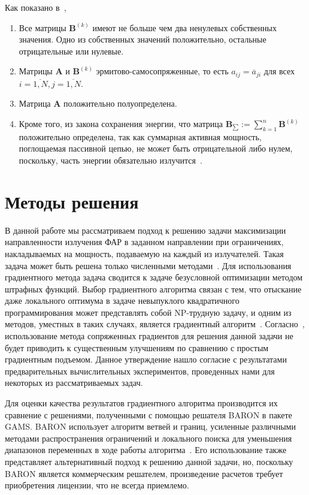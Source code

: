 Как показано в~\cite{yurkov:farkv},
%
\begin{enumerate}
  \item Все матрицы $\textbf{B}^{(k)}$ имеют не больше чем два ненулевых собственных значения. Одно из собственных значений положительно,
  остальные отрицательные или нулевые.
  \item Матрицы $\textbf{A}$ и $\textbf{B}^{(k)}$ эрмитово-самосопряженные, то есть
  $a_{ij} = \overline{a}_{ji}$ для всех $i = \overline{1,N}, j = \overline{1,N}$.
  \item Матрица $\textbf{A}$ положительно полуопределена.
  \item Кроме того, из закона сохранения энергии, что матрица $\textbf{B}_{\sum}:= \sum_{k=1}^{n} \textbf{B}^{(k)}$
  положительно определена, так как суммарная активная мощность, поглощаемая пассивной цепью, не может быть отрицательной либо нулем,
  поскольку, часть энергии обязательно излучится~\cite{yurkov:farkv}.
\end{enumerate}

\section{Методы решения}

В данной работе мы рассматриваем подход к решению задачи максимизации направленности излучения ФАР в заданном направлении при ограничениях, накладываемых на мощность, подаваемую на каждый из излучателей. Такая задача может быть решена только численными методами~\cite{yurkov:farkv}. Для использования градиентного метода задача сводится к задаче безусловной оптимизации методом штрафных функций. Выбор градиентного алгоритма связан с тем, что отыскание даже локального оптимума в задаче невыпуклого квадратичного программирования может представлять собой NP-трудную задачу, и одним из методов, уместных в таких случаях, является градиентный алгоритм~\cite{murty:np}. Согласно~\cite{nesterov:nonconvex}, использование метода сопряженных градиентов для решения данной задачи не будет приводить к существенным улучшениям по сравнению с простым градиентным подъемом. Данное утверждение нашло согласие с результатами предварительных вычислительных экспериментов, проведенных нами для некоторых из рассматриваемых задач.

Для оценки качества результатов градиентного алгоритма производится их сравнение с решениями, полученными с помощью решателя
BARON в пакете GAMS. BARON использует алгоритм ветвей и границ, усиленные различными методами распространения ограничений и локального поиска для уменьшения диапазонов переменных в ходе работы алгоритма~\cite{ryoo:nlp}. Его использование также представляет альтернативный подход к решению данной задачи, но, поскольку BARON является коммерческим решателем, произведение расчетов требует приобретения лицензии, что не всегда приемлемо.

